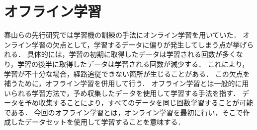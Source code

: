 \newpage
\section{オフライン学習}
春山らの先行研究では学習機の訓練の手法にオンライン学習を用いていた．
オンライン学習の欠点として，学習するデータに偏りが発生してしまう点が挙げられる．
具体的には，学習の初期に取得したデータは学習される回数が多くなり，学習の後半に取得したデータは学習される回数が減少する．
これにより，学習が不十分な場合，経路追従できない箇所が生じることがある．
この欠点を補うために，オフライン学習を併用して行う．
オフライン学習とは一般的に用いられる学習方法で，予め収集したデータを使用して学習する手法を指す．
データを予め収集することにより，すべてのデータを同じ回数学習することが可能である．
今回のオフライン学習とは，オンライン学習を最初に行い，そこで作成したデータセットを使用して学習することを意味する．
